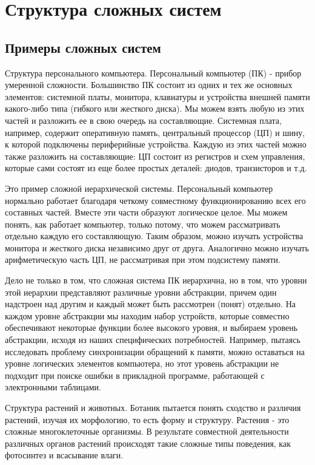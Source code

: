 \documentclass[11pt]{article}
\begin{document}
\section{Структура сложных систем}
\subsection{Примеры сложных систем}
Структура персонального компьютера. Персональный компьютер (ПК) - прибор умеренной сложности. Большинство ПК состоит из одних и тех же основных элементов: системной платы, монитора, клавиатуры и устройства внешней памяти какого-либо типа (гибкого или жесткого диска). Мы можем взять любую из этих частей и разложить ее в свою очередь на составляющие. Системная плата, например, содержит оперативную память, центральный процессор (ЦП) и шину, к которой подключены периферийные устройства. Каждую из этих частей можно также разложить на составляющие: ЦП состоит из регистров и схем управления, которые сами состоят из еще более простых деталей: диодов, транзисторов и т.д.\par
Это пример сложной иерархической системы. Персональный компьютер нормально работает благодаря четкому совместному функционированию всех его составных частей. Вместе эти части образуют логическое целое. Мы можем понять, как работает компьютер, только потому, что можем рассматривать отдельно каждую его составляющую. Таким образом, можно изучать устройства монитора и жесткого диска независимо друг от друга. Аналогично можно изучать арифметическую часть ЦП, не рассматривая при этом подсистему памяти. \par
Дело не только в том, что сложная система ПК иерархична, но в том, что уровни этой иерархии представляют различные уровни абстракции, причем один надстроен над другим и каждый может быть рассмотрен (понят) отдельно. На каждом уровне абстракции мы находим набор устройств, которые совместно обеспечивают некоторые функции более высокого уровня, и выбираем уровень абстракции, исходя из наших специфических потребностей. Например, пытаясь исследовать проблему синхронизации обращений к памяти, можно оставаться на уровне логических элементов компьютера, но этот уровень абстракции не подходит при поиске ошибки в прикладной программе, работающей с электронными таблицами.\par
Структура растений и животных. Ботаник пытается понять сходство и различия растений, изучая их морфологию, то есть форму и структуру. Растения - это сложные многоклеточные организмы. В результате совместной деятельности различных органов растений происходят такие сложные типы поведения, как фотосинтез и всасывание влаги. \par
\end{document}

